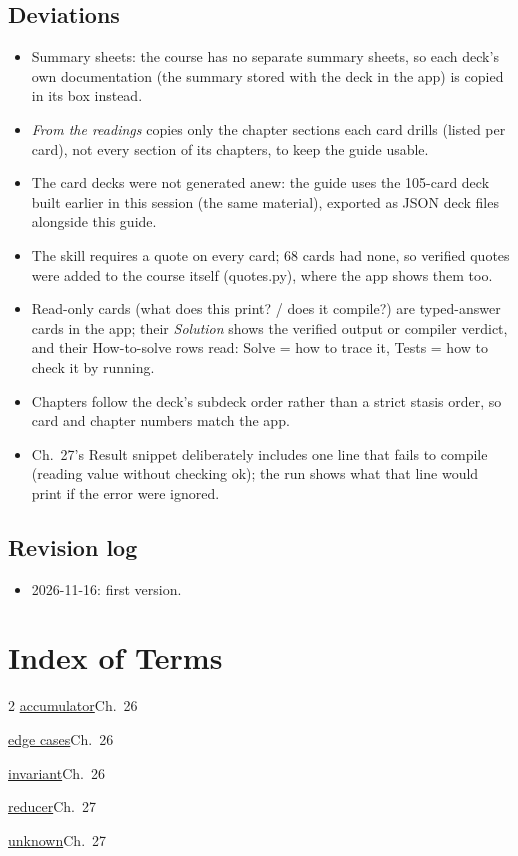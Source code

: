 \documentclass[10pt]{article}
\newcommand{\code}[1]{{\ttfamily\small #1}}
\newcommand{\ix}[3]{\hyperlink{t:#1}{#2}\dotfill #3\par}
\begin{document}
\subsection*{Deviations}
{\footnotesize\begin{itemize}
\item Summary sheets: the course has no separate summary sheets, so each deck's own documentation (the summary stored with the deck in the app) is copied in its box instead.
\item \emph{From the readings} copies only the chapter sections each card drills (listed per card), not every section of its chapters, to keep the guide usable.
\item The card decks were not generated anew: the guide uses the 105-card deck built earlier in this session (the same material), exported as JSON deck files alongside this guide.
\item The skill requires a quote on every card; 68 cards had none, so verified quotes were added to the course itself (\code{quotes.py}), where the app shows them too.
\item Read-only cards (what does this print? / does it compile?) are typed-answer cards in the app; their \emph{Solution} shows the verified output or compiler verdict, and their How-to-solve rows read: Solve = how to trace it, Tests = how to check it by running.
\item Chapters follow the deck's subdeck order rather than a strict stasis order, so card and chapter numbers match the app.
\item Ch.~27's Result snippet deliberately includes one line that fails to compile (reading value without checking ok); the run shows what that line would print if the error were ignored.
\end{itemize}}
\subsection*{Revision log}
{\footnotesize\begin{itemize}
\item 2026-11-16: first version.
\end{itemize}}
\section*{Index of Terms}
{\small\begin{multicols}{2}
\ix{accumulator}{accumulator}{Ch.~26}
\ix{edge}{edge cases}{Ch.~26}
\ix{invariant}{invariant}{Ch.~26}
\ix{reducer}{reducer}{Ch.~27}
\ix{unknown}{unknown}{Ch.~27}
\end{multicols}}
\end{document}
